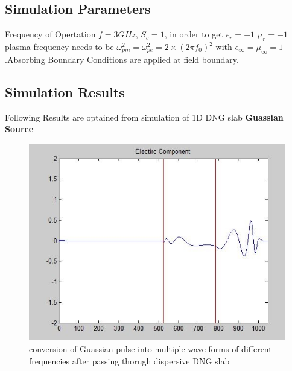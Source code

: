 \subsection{Simulation Parameters}
Frequency of Opertation $f=3 GHz$, $S_c=1$, in order to get $\epsilon_r= -1$ $\mu_r= -1$ plasma frequency needs to be $\omega_{pm}^2 = \omega_{pe}^2 = 2 \times (2\pi f_0)^2$ with $\epsilon_\infty = \mu_\infty = 1$.Absorbing Boundary Conditions are applied at field boundary.
\subsection{Simulation Results}
Following Results are optained from simulation of 1D DNG slab
\textbf{Guassian Source}\\
\begin{figure}[htbp]
	\centering
		\includegraphics[width=5in]{Figures/drude3.jpg}
	\caption[Guassian Pulse after Passing through DNG slab]{conversion of Guassian pulse into multiple wave forms of different frequencies after passing thorugh dispersive DNG slab}
	\label{drude3}
\end{figure}

